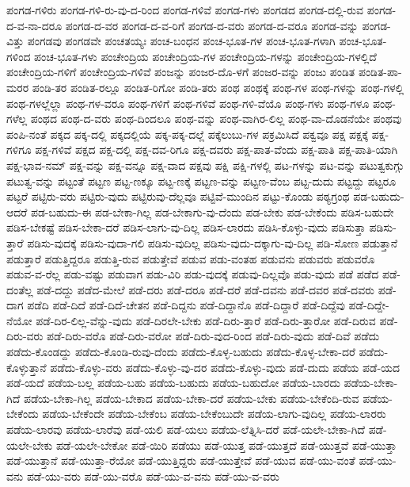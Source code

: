 {ಪಂಗಡ-ಗಳಿರು
ಪಂಗಡ-ಗಳಿ-ರು-ವು-ದ-ರಿಂದ
ಪಂಗಡ-ಗಳಿವೆ
ಪಂಗಡ-ಗಳು
ಪಂಗಡದ
ಪಂಗಡ-ದಲ್ಲಿ-ರುವ
ಪಂಗಡ-ದ-ವ-ನಾ-ದರೂ
ಪಂಗಡ-ದ-ವರ
ಪಂಗಡ-ದ-ವ-ರಿಗೆ
ಪಂಗಡ-ದ-ವರು
ಪಂಗಡ-ದ-ವರೂ
ಪಂಗಡ-ವನ್ನು
ಪಂಗಡ-ವಿತ್ತು
ಪಂಗಡವು
ಪಂಗಡವೇ
ಪಂಚತಯ್ಯಃ
ಪಂಚ-ಬಂಧನ
ಪಂಚ-ಭೂತ-ಗಳ
ಪಂಚ-ಭೂತ-ಗಳಾಗಿ
ಪಂಚ-ಭೂತ-ಗಳಿಂದ
ಪಂಚ-ಭೂತ-ಗಳು
ಪಂಚೇಂದ್ರಿಯ
ಪಂಚೇಂದ್ರಿಯ-ಗಳ
ಪಂಚೇಂದ್ರಿಯ-ಗಳನ್ನು
ಪಂಚೇಂದ್ರಿಯ-ಗಳಲ್ಲಿದೆ
ಪಂಚೇಂದ್ರಿಯ-ಗಳಿಗೆ
ಪಂಚೇಂದ್ರಿಯ-ಗಳಿವೆ
ಪಂಜನ್ನು
ಪಂಜರ-ದೊ-ಳಗೆ
ಪಂಜರ-ವನ್ನು
ಪಂಜು
ಪಂಡಿತ
ಪಂಡಿತ-ಪಾ-ಮರರ
ಪಂಡಿ-ತರ
ಪಂಡಿತ-ರಲ್ಲೂ
ಪಂಡಿತ-ರಿಗೋ
ಪಂಡಿ-ತರು
ಪಂಥ
ಪಂಥಕ್ಕೆ
ಪಂಥ-ಗಳ
ಪಂಥ-ಗಳನ್ನು
ಪಂಥ-ಗಳಲ್ಲಿ
ಪಂಥ-ಗಳಲ್ಲೆಲ್ಲಾ
ಪಂಥ-ಗಳ-ವರೂ
ಪಂಥ-ಗಳಿಗೆ
ಪಂಥ-ಗಳಿವೆ
ಪಂಥ-ಗಳಿ-ವೆಯೊ
ಪಂಥ-ಗಳು
ಪಂಥ-ಗಳೂ
ಪಂಥ-ಗಳೆಲ್ಲ
ಪಂಥದ
ಪಂಥ-ದ-ವರು
ಪಂಥ-ದಿಂದಲೂ
ಪಂಥ-ವನ್ನು
ಪಂಥ-ವಾಗಿರ-ಲಿಲ್ಲ
ಪಂಥ-ವಾ-ದೊಡನೆಯೇ
ಪಂಥವು
ಪಂಪಿ-ನಂತೆ
ಪಕ್ಕದ
ಪಕ್ಕ-ದಲ್ಲಿ
ಪಕ್ಕದಲ್ಲಿಯೆ
ಪಕ್ಕ-ಪಕ್ಕ-ದಲ್ಲೆ
ಪಕ್ಕೆಲುಬು-ಗಳ
ಪಕ್ರಮಿಸಿದೆ
ಪಕ್ವವೂ
ಪಕ್ಷ
ಪಕ್ಷಕ್ಕೆ
ಪಕ್ಷ-ಗಳಿಗೂ
ಪಕ್ಷ-ಗಳಿವೆ
ಪಕ್ಷದ
ಪಕ್ಷ-ದಲ್ಲಿ
ಪಕ್ಷ-ದವ-ರಿಗೂ
ಪಕ್ಷ-ದವರು
ಪಕ್ಷ-ಪಾತ-ವೆಂದು
ಪಕ್ಷ-ಪಾತಿ
ಪಕ್ಷ-ಪಾತಿ-ಯಾಗಿ
ಪಕ್ಷ-ಭಾವ-ನಮ್
ಪಕ್ಷ-ವನ್ನು
ಪಕ್ಷ-ವನ್ನೂ
ಪಕ್ಷ-ವಾದ
ಪಕ್ಷವು
ಪಕ್ಷಿ
ಪಕ್ಷಿ-ಗಳಲ್ಲಿ
ಪಟ-ಗಳನ್ನು
ಪಟ-ವನ್ನು
ಪಟುತ್ವಕುಗ್ಗು
ಪಟುತ್ವ-ವನ್ನು
ಪಟ್ಟಂತೆ
ಪಟ್ಟಣ
ಪಟ್ಟ-ಣಕ್ಕೂ
ಪಟ್ಟ-ಣಕ್ಕೆ
ಪಟ್ಟಣ-ವನ್ನು
ಪಟ್ಟಣ-ವೆಂಬ
ಪಟ್ಟ-ದುದು
ಪಟ್ಟದ್ದು
ಪಟ್ಟರೂ
ಪಟ್ಟರೆ
ಪಟ್ಟಿರು-ವರು
ಪಟ್ಟಿರು-ವುದು
ಪಟ್ಟಿರುವು-ದೆಲ್ಲವೂ
ಪಟ್ಟಿವೆ-ಮುಂದಿನ
ಪಟ್ಟು-ಕೊಂಡು
ಪಠ್ಯಗ್ರಂಥ
ಪಡ-ಬಹುದು-ಆದರೆ
ಪಡ-ಬಹುದು-ಈ
ಪಡ-ಬೇಕಾ-ಗಿಲ್ಲ
ಪಡ-ಬೇಕಾಗು-ವು-ದೆಂದು
ಪಡ-ಬೇಕು
ಪಡ-ಬೇಕೆಂದು
ಪಡಿಸ-ಬಹುದೇ
ಪಡಿಸ-ಬೇಕಷ್ಟೆ
ಪಡಿಸ-ಬೇಕಾ-ದರೆ
ಪಡಿಸ-ಲಾಗು-ವು-ದಿಲ್ಲ
ಪಡಿಸ-ಲಾರದು
ಪಡಿಸಿ-ಕೊಳ್ಳು-ವುದು
ಪಡಿಸುತ್ತಾ
ಪಡಿಸು-ತ್ತಾರೆ
ಪಡಿಸು-ವುದಕ್ಕೆ
ಪಡಿಸು-ವುದಾ-ಗಲಿ
ಪಡಿಸು-ವುದಿಲ್ಲ
ಪಡಿಸು-ವುದು-ದಕ್ಕಾಗು-ವು-ದಿಲ್ಲ
ಪಡಿ-ಸೋಣ
ಪಡುತ್ತಾನೆ
ಪಡುತ್ತಾರೆ
ಪಡುತ್ತಿದ್ದರೂ
ಪಡುತ್ತಿ-ರುವ
ಪಡುತ್ತೇವೆ
ಪಡುವ
ಪಡು-ವಂತಹ
ಪಡುವನು
ಪಡುವರು
ಪಡುವರೊ
ಪಡುವ-ವ-ರೆಲ್ಲ
ಪಡು-ವಷ್ಟು
ಪಡುವಾಗ
ಪಡು-ವಿರಿ
ಪಡು-ವುದಕ್ಕೆ
ಪಡುವು-ದಿಲ್ಲವೊ
ಪಡು-ವುದು
ಪಡೆ
ಪಡೆದ
ಪಡೆ-ದಂತೆಲ್ಲ
ಪಡೆ-ದದ್ದು
ಪಡೆದ-ಮೇಲೆ
ಪಡೆ-ದರು
ಪಡೆ-ದರೂ
ಪಡೆ-ದರೆ
ಪಡೆ-ದವನು
ಪಡೆ-ದವರ
ಪಡೆ-ದವರು
ಪಡೆ-ದಾಗ
ಪಡೆದಿ
ಪಡೆ-ದಿದೆ
ಪಡೆ-ದಿದೆ-ಚೇತನ
ಪಡೆ-ದಿದ್ದನು
ಪಡೆ-ದಿದ್ದಾನೊ
ಪಡೆ-ದಿದ್ದಾರೆ
ಪಡೆ-ದಿದ್ದೆವು
ಪಡೆ-ದಿದ್ದೇ-ನೆಯೋ
ಪಡೆ-ದಿರ-ಲಿಲ್ಲ-ವೆನ್ನು-ವುದು
ಪಡೆ-ದಿರಲೇ-ಬೇಕು
ಪಡೆ-ದಿರು-ತ್ತಾರೆ
ಪಡೆ-ದಿರು-ತ್ತಾರೋ
ಪಡೆ-ದಿರುವ
ಪಡೆ-ದಿರು-ವರು
ಪಡೆ-ದಿರು-ವರೊ
ಪಡೆ-ದಿರು-ವರೋ
ಪಡೆ-ದಿರು-ವುದ-ರಿಂದ
ಪಡೆ-ದಿರು-ವುದು
ಪಡೆ-ದಿವೆ
ಪಡೆದು
ಪಡೆದು-ಕೊಂಡದ್ದು
ಪಡೆದು-ಕೊಂಡಿ-ರುವು-ದೆಂದು
ಪಡೆದು-ಕೊಳ್ಳ-ಬಹುದು
ಪಡೆದು-ಕೊಳ್ಳ-ಬೇಕಾ-ದರೆ
ಪಡೆದು-ಕೊಳ್ಳುತ್ತಾನೆ
ಪಡೆದು-ಕೊಳ್ಳು-ವರು
ಪಡೆದು-ಕೊಳ್ಳು-ವು-ದರ
ಪಡೆದು-ಕೊಳ್ಳು-ವುದು
ಪಡೆ-ದುದು
ಪಡೆಯ
ಪಡೆ-ಯದ
ಪಡೆ-ಯದೆ
ಪಡೆಯ-ಬಲ್ಲ
ಪಡೆಯ-ಬಹು
ಪಡೆಯ-ಬಹುದು
ಪಡೆಯ-ಬಹುದೋ
ಪಡೆಯ-ಬಾರದು
ಪಡೆಯ-ಬೇಕಾ-ಗಿದೆ
ಪಡೆಯ-ಬೇಕಾ-ಗಿಲ್ಲ
ಪಡೆಯ-ಬೇಕಾದ
ಪಡೆಯ-ಬೇಕಾ-ದರೆ
ಪಡೆಯ-ಬೇಕು
ಪಡೆಯ-ಬೇಕೆಂದಿ-ರುವ
ಪಡೆಯ-ಬೇಕೆಂದು
ಪಡೆಯ-ಬೇಕೆಂದೇ
ಪಡೆಯ-ಬೇಕೆಂಬ
ಪಡೆಯ-ಬೇಕೆಂಬುದೇ
ಪಡೆಯ-ಲಾಗು-ವುದಿಲ್ಲ
ಪಡೆಯ-ಲಾರರು
ಪಡೆಯ-ಲಾರವು
ಪಡೆಯ-ಲಾರೆವು
ಪಡೆ-ಯಲಿ
ಪಡೆ-ಯಲು
ಪಡೆಯ-ಲೆತ್ನಿಸಿ-ದರೆ
ಪಡೆ-ಯಲೇ-ಬೇಕಾ-ಗಿದೆ
ಪಡೆ-ಯಲೇ-ಬೇಕು
ಪಡೆ-ಯಲೇ-ಬೇಕೋ
ಪಡೆ-ಯಿರಿ
ಪಡೆಯು
ಪಡೆ-ಯುತ್ತ
ಪಡೆ-ಯುತ್ತದೆ
ಪಡೆ-ಯುತ್ತವೆ
ಪಡೆ-ಯುತ್ತಾ
ಪಡೆ-ಯುತ್ತಾನೆ
ಪಡೆ-ಯುತ್ತಾ-ರೆಯೋ
ಪಡೆ-ಯುತ್ತಿದ್ದರು
ಪಡೆ-ಯುತ್ತೇವೆ
ಪಡೆ-ಯುವ
ಪಡೆ-ಯು-ವಂತೆ
ಪಡೆ-ಯು-ವನು
ಪಡೆ-ಯು-ವರು
ಪಡೆ-ಯು-ವರೊ
ಪಡೆ-ಯು-ವ-ವನು
ಪಡೆ-ಯು-ವ-ವರು
}
